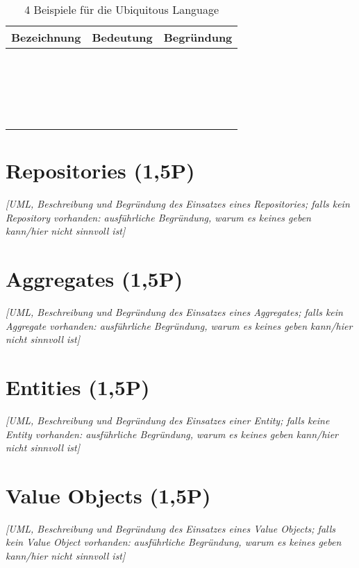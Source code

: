 \begin{table}[htbp]
\centering
    \begin{tabular}{|l|l|l|}
        \hline
        \textbf{Bezeichnung} & \textbf{Bedeutung} & \textbf{Begründung} \\ \hline
        ~         & ~          & ~  \\ \hline
        ~         & ~          & ~  \\ \hline
        ~         & ~          & ~  \\ \hline
        ~         & ~          & ~  \\ 

        \hline
    \end{tabular}
    \label{Tab:ddd_examples}
    \caption{4 Beispiele für die Ubiquitous Language}
\end{table}

\section{Repositories (1,5P)}
\emph{[UML, Beschreibung und Begründung des Einsatzes eines Repositories; falls kein Repository
vorhanden: ausführliche Begründung, warum es keines geben kann/hier nicht sinnvoll ist]}

\section{Aggregates (1,5P)}
\emph{[UML, Beschreibung und Begründung des Einsatzes eines Aggregates; falls kein Aggregate
vorhanden: ausführliche Begründung, warum es keines geben kann/hier nicht sinnvoll ist]}

\section{Entities (1,5P)}
\emph{[UML, Beschreibung und Begründung des Einsatzes einer Entity; falls keine Entity vorhanden:
ausführliche Begründung, warum es keines geben kann/hier nicht sinnvoll ist]}

\section{Value Objects (1,5P)}
\emph{[UML, Beschreibung und Begründung des Einsatzes eines Value Objects; falls kein Value Object
vorhanden: ausführliche Begründung, warum es keines geben kann/hier nicht sinnvoll ist]}

\newpage
\titlespacing*{\chapter}{0pt}{-30mm}{10pt}
  

